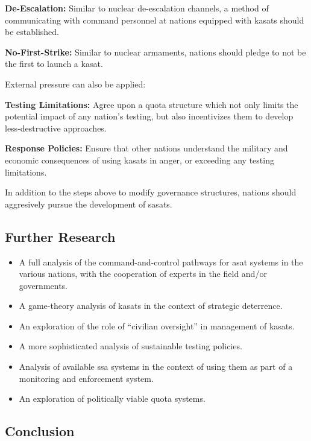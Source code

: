 \textbf{De-Escalation:} Similar to nuclear de-escalation channels, a
method of communicating with command personnel at nations equipped
with \acp{kasat} should be established.

\textbf{No-First-Strike:} Similar to nuclear armaments, nations should
pledge to not be the first to launch a \ac{kasat}.

\noindent External pressure can also be applied:

\textbf{Testing Limitations:} Agree upon a quota structure which not
only limits the potential impact of any nation's testing, but also
incentivizes them to develop less-destructive approaches.

\textbf{Response Policies:} Ensure that other nations understand the
military and economic consequences of using \acp{kasat} in anger, or
exceeding any testing limitations.

In addition to the steps above to modify governance structures,
nations should aggresively pursue the development of \acp{sasat}.


\subsection{Further Research}

\begin{itemize}

\item A full analysis of the command-and-control pathways for asat
  systems in the various nations, with the cooperation of experts in
  the field and/or governments.

\item A game-theory analysis of \acp{kasat} in the context of
  strategic deterrence.

\item An exploration of the role of ``civilian oversight'' in
  management of \acp{kasat}.

\item A more sophisticated analysis of sustainable testing policies.

\item Analysis of available \ac{ssa} systems in the context of using
  them as part of a monitoring and enforcement system.

\item An exploration of politically viable quota systems.

\end{itemize}


\subsection{Conclusion}


